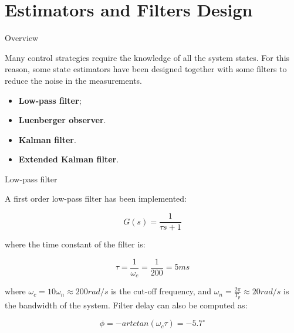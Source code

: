 \section{Estimators and Filters Design}
\label{sec:filters_estimators_design}

\begin{frame}{Overview}

    Many control strategies require the knowledge of all the system states.
    For this reason, some state estimators have been designed together with some filters to reduce the noise in the measurements.

    \begin{itemize}
        \item \textbf{Low-pass filter};
        \item \textbf{Luenberger observer}.
        \item \textbf{Kalman filter}.
        \item \textbf{Extended Kalman filter}.
    \end{itemize}

\end{frame}

\begin{frame}{Low-pass filter}

    A first order low-pass filter has been implemented:

    \begin{equation}
        G(s) = \frac{1}{\tau s + 1}
    \end{equation}

    where the time constant of the filter is:

    \begin{equation}
        \tau = \frac{1}{\omega_c}=\frac{1}{200} = 5 ms
    \end{equation}

    where $\omega_c = 10 \omega_n \approx 200 rad/s$ is  the cut-off frequency, and $\omega_n = \frac{2\pi}{T_p} \approx 20 rad/s$ is the bandwidth of the system.
    Filter delay can also be computed as:

    \begin{equation}
        \phi = -artctan(\omega_c \tau) = -5.7^{\circ}
    \end{equation}

\end{frame}



